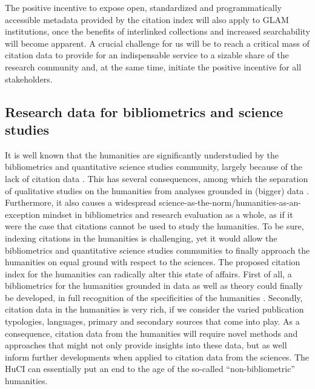 The positive incentive to expose open, standardized and programmatically accessible metadata provided by the citation index will also apply to GLAM institutions, once the benefits of interlinked collections and increased searchability will become apparent. A crucial challenge for us will be to reach a critical mass of citation data to provide for an indispensable service to a sizable share of the research community and, at the same time, initiate the positive incentive for all stakeholders.

\subsection{Research data for bibliometrics and science studies}
 
It is well known that the humanities are significantly understudied by the bibliometrics and quantitative science studies community, largely because of the lack of citation data \cite{colavizza_citation_2019}. This has several consequences, among which the separation of qualitative studies on the humanities from analyses grounded in (bigger) data \cite{franssen_science_2019}. Furthermore, it also causes a widespread science-as-the-norm/humanities-as-an-exception mindset in bibliometrics and research evaluation as a whole, as if it were the case that citations cannot be used to study the humanities. To be sure, indexing citations in the humanities is challenging, yet it would allow the bibliometrics and quantitative science studies communities to finally approach the humanities on equal ground with respect to the sciences.
The proposed citation index for the humanities can radically alter this state of affairs. First of all, a bibliometrics for the humanities grounded in data as well as theory could finally be developed, in full recognition of the specificities of the humanities \cite{hammarfelt_beyond_2016}. Secondly, citation data in the humanities is very rich, if we consider the varied publication typologies, languages, primary and secondary sources that come into play. As a consequence, citation data from the humanities will require novel methods and approaches that might not only provide insights into these data, but as well inform further developments when applied to citation data from the sciences. The HuCI can essentially put an end to the age of the so-called ``non-bibliometric'' humanities.


